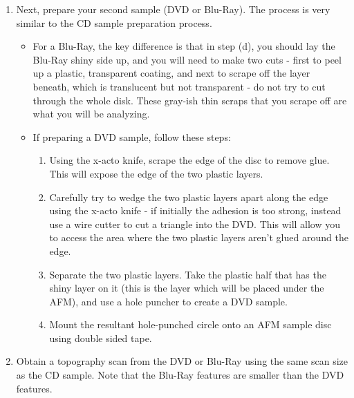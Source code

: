 \documentclass{../lab}
\begin{document}
\begin{enumerate}
    \item Next, prepare your second sample (DVD or Blu-Ray). The process is very similar to the CD sample preparation process. 
    \begin{itemize}
        \item For a Blu-Ray, the key difference is that in step (d), you should lay the Blu-Ray shiny side up, and you will need to make two cuts - first to peel up a plastic, transparent coating, and next to scrape off the layer beneath, which is translucent but not transparent - do not try to cut through the whole disk. These gray-ish thin scraps that you scrape off are what you will be analyzing. 
        \item If preparing a DVD sample, follow these steps:
        \begin{enumerate}
            \item Using the x-acto knife, scrape the edge of the disc to remove glue. This will expose the edge of the two plastic layers.
            \item Carefully try to wedge the two plastic layers apart along the edge using the x-acto knife - if initially the adhesion is too strong, instead use a wire cutter to cut a triangle into the DVD. This will allow you to access the area where the two plastic layers aren’t glued around the edge. 
            \item Separate the two plastic layers. Take the plastic half that has the shiny layer on it (this is the layer which will be placed under the AFM), and use a hole puncher to create a DVD sample. 
            \item Mount the resultant hole-punched circle onto an AFM sample disc using double sided tape.

        \end{enumerate}
    \end{itemize}
    
    \item Obtain a topography scan from the DVD or Blu-Ray using the same scan size as the CD sample. Note that the Blu-Ray features are smaller than the DVD features. 
    

\end{enumerate}
\end{document}
